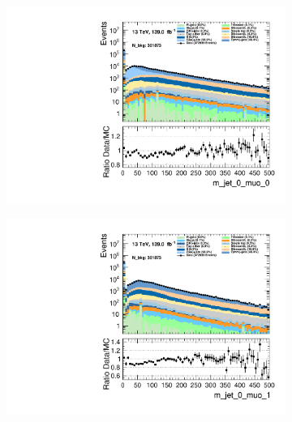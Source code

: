 \begin{figure}
\begin{subfigure}{.49\textwidth}
        \includegraphics[width=\textwidth]{Figures/MC_Data_comp/m_jet_0_muo_0.pdf}
        \caption{ }
        \label{fig:fep}
    \end{subfigure}
    \hfill
    \begin{subfigure}{.49\textwidth}
        \includegraphics[width=\textwidth]{Figures/MC_Data_comp/m_jet_0_muo_1.pdf}
        \caption{ }
        \label{fig:fe}
    \end{subfigure}
    \hfill       
    \caption{}
    \label{fig:t}
\end{figure}

